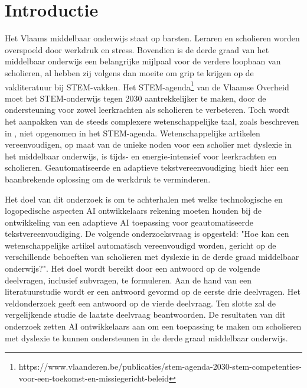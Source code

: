 
\section{Introductie}%
\label{sec:introductie}


Het Vlaams middelbaar onderwijs staat op barsten. Leraren en scholieren worden overspoeld door werkdruk en stress. Bovendien is de derde graad van het middelbaar onderwijs een belangrijke mijlpaal voor de verdere loopbaan van scholieren, al hebben zij volgens \textcite{Dapaah2022} dan moeite om grip te krijgen op de vakliteratuur bij STEM-vakken. Het STEM-agenda\footnote{https://www.vlaanderen.be/publicaties/stem-agenda-2030-stem-competenties-voor-een-toekomst-en-missiegericht-beleid} van de Vlaamse Overheid moet het STEM-onderwijs tegen 2030 aantrekkelijker te maken, door de ondersteuning voor zowel leerkrachten als scholieren te verbeteren. Toch wordt het aanpakken van de steeds complexere wetenschappelijke taal, zoals beschreven in \textcite{Barnett2020}, niet opgenomen in het STEM-agenda. Wetenschappelijke artikelen vereenvoudigen, op maat van de unieke noden voor een scholier met dyslexie in het middelbaar onderwijs, is tijds- en energie-intensief voor leerkrachten en scholieren. Geautomatiseerde en adaptieve tekstvereenvoudiging biedt hier een baanbrekende oplossing om de werkdruk te verminderen.

Het doel van dit onderzoek is om te achterhalen met welke technologische en logopedische aspecten AI ontwikkelaars rekening moeten houden bij de ontwikkeling van een adaptieve AI toepassing voor geautomatiseerde tekstvereenvoudiging. De volgende onderzoeksvraag is opgesteld: "Hoe kan een wetenschappelijke artikel automatisch vereenvoudigd worden, gericht op de verschillende behoeften van scholieren met dyslexie in de derde graad middelbaar onderwijs?". Het doel wordt bereikt door een antwoord op de volgende deelvragen, inclusief subvragen, te formuleren. Aan de hand van een literatuurstudie wordt er een antwoord gevormd op de eerste drie deelvragen. Het veldonderzoek geeft een antwoord op de vierde deelvraag. Ten slotte zal de vergelijkende studie de laatste deelvraag beantwoorden. De resultaten van dit onderzoek zetten AI ontwikkelaars aan om een toepassing te maken om scholieren met dyslexie te kunnen ondersteunen in de derde graad middelbaar onderwijs.

